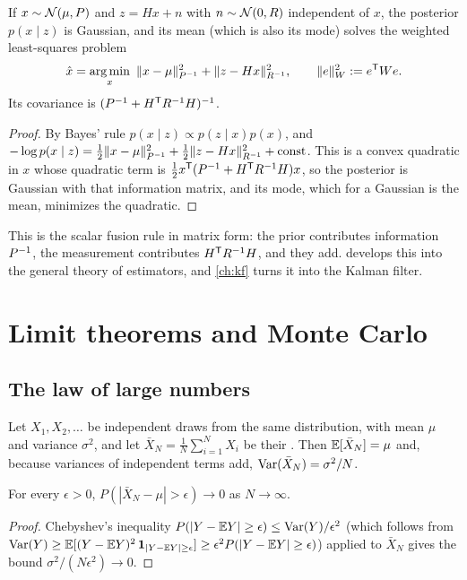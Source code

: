 \begin{proposition}
\label{prop:map-ls}
If $x \sim \mathcal{N}(\mu, P)$ and $z = Hx + n$ with $n \sim \mathcal{N}(0, R)$ independent of $x$, the posterior $p(x\mid z)$ is Gaussian, and its mean (which is
also its mode) solves the weighted least-squares problem
\begin{equation}
  \hat x = \argmin_x\ \|x - \mu\|^2_{P\inv} + \|z - Hx\|^2_{R\inv},
  \qquad \|e\|^2_{W} := e\T W e .
  \label{eq:map-ls}
\end{equation}
Its covariance is $(P^{-1} + H^{\mathsf{T}} R^{-1} H)^{-1}$.
\end{proposition}
\begin{proof}
By Bayes' rule $p(x\mid z) \propto p(z\mid x)p(x)$, and
$-\log p(x\mid z) = \tfrac12\|x - \mu\|^2_{P^{-1}} + \tfrac12\|z - Hx\|^2_{R^{-1}} + \text{const}$. This is a convex quadratic in $x$ whose quadratic term is
$\tfrac12x^{\mathsf{T}}(P^{-1} + H^{\mathsf{T}} R^{-1} H)x$, so the posterior is Gaussian with that information matrix, and its mode, which for a Gaussian is the mean,
minimizes the quadratic.
\end{proof}

This is the scalar fusion rule in matrix form: the prior contributes information $P^{-1}$, the measurement contributes $H^{\mathsf{T}} R^{-1} H$, and they add.
 develops this into the general theory of estimators, and \cref{ch:kf} turns it into the Kalman filter.

\section{Limit theorems and Monte Carlo}

\subsection{The law of large numbers}

Let $X_1, X_2, \dots$ be independent draws from the same distribution, with mean $\mu$ and variance $\sigma^2$, and let
$\bar X_N = \frac1N\sum_{i=1}^NX_i$ be their . Then $\mathbb{E}[\bar X_N] = \mu$ and, because variances of independent terms add,
$\operatorname{Var}(\bar X_N) = \sigma^2/N$.

\begin{theorem}
For every $\epsilon > 0$, $P(|\bar X_N - \mu| > \epsilon) \to 0$ as $N\to\infty$.
\end{theorem}
\begin{proof}
Chebyshev's inequality $P(|Y - \mathbb{E} Y| \ge \epsilon) \le \operatorname{Var}(Y)/\epsilon^2$ (which follows from
$\operatorname{Var}(Y) \ge \mathbb{E}[(Y - \mathbb{E} Y)^2\,\mathbf 1_{|Y - \mathbb{E} Y|\ge\epsilon}] \ge \epsilon^2P(|Y - \mathbb{E} Y|\ge\epsilon)$) applied to $\bar X_N$ gives the bound
$\sigma^2/(N\epsilon^2) \to 0$.
\end{proof}

